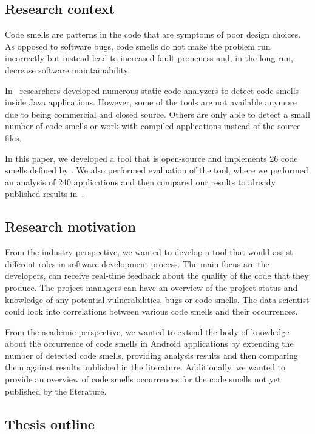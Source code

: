 \subsection{Research context}\label{subsec:research-context}

Code smells are patterns in the code that are symptoms of poor design choices.
As opposed to software bugs, code smells do not make the problem run incorrectly but
instead lead to increased fault-proneness and, in the long run, decrease software maintainability.

In~\cite{mannan2016understanding, sonar-plugin-external, paprika-paper} researchers developed
numerous static code analyzers to detect code smells inside Java applications.
However, some of the tools are not available anymore due to being commercial and closed source.
Others are only able to detect a small number of code smells or work with compiled applications instead
of the source files.

In this paper, we developed a tool that is open-source and implements 26 code smells defined by \citeauthor{refactoring-fowler}.
We also performed evaluation of the tool, where we performed an analysis of 240 applications and then
compared our results to already published results in~\cite{mannan2016understanding}.

\subsection{Research motivation}\label{subsec:research-motivation}

From the industry perspective, we wanted to develop a tool that would assist different roles in software development process.
The main focus are the developers, can receive real-time feedback about the quality of the code that they produce.
The project managers can have an overview of the project status and knowledge of any potential vulnerabilities, bugs
or code smells.
The data scientist could look into correlations between various code smells and their occurrences.

From the academic perspective, we wanted to extend the body of knowledge about the occurrence of code smells in Android
applications by extending the number of detected code smells, providing analysis results and then comparing them against
results published in the literature.
Additionally, we wanted to provide an overview of code smells occurrences for the code smells not yet published by the
literature.

\subsection{Thesis outline}\label{subsec:thesis-outline}

